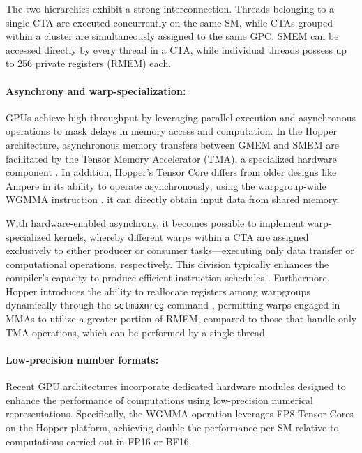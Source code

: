 \begin{enumerate}
The two hierarchies exhibit a strong interconnection. Threads belonging to a single CTA are executed concurrently on the same SM, while CTAs grouped within a cluster are simultaneously assigned to the same GPC. SMEM can be accessed directly by every thread in a CTA, while individual threads possess up to 256 private registers (RMEM) each.

\paragraph{Asynchrony and warp-specialization:}

GPUs achieve high throughput by leveraging parallel execution and asynchronous operations to mask delays in memory access and computation. In the Hopper architecture, asynchronous memory transfers between GMEM and SMEM are facilitated by the Tensor Memory Accelerator (TMA), a specialized hardware component \cite[\S7.29]{cuda}. In addition, Hopper’s Tensor Core differs from older designs like Ampere in its ability to operate asynchronously; using the warpgroup-wide WGMMA instruction \cite[\S9.7.14]{ptx}, it can directly obtain input data from shared memory.

With hardware-enabled asynchrony, it becomes possible to implement warp-specialized kernels, whereby different warps within a CTA are assigned exclusively to either producer or consumer tasks—executing only data transfer or computational operations, respectively. This division typically enhances the compiler's capacity to produce efficient instruction schedules \citep{warp-specialization-2011}. Furthermore, Hopper introduces the ability to reallocate registers among warpgroups dynamically through the \verb|setmaxnreg| command \cite[\S9.7.17.1]{ptx}, permitting warps engaged in MMAs to utilize a greater portion of RMEM, compared to those that handle only TMA operations, which can be performed by a single thread.

\paragraph{Low-precision number formats:}
\label{sec:low-precision-gpu}
Recent GPU architectures incorporate dedicated hardware modules designed to enhance the performance of computations using low-precision numerical representations. Specifically, the WGMMA operation leverages FP8 Tensor Cores on the Hopper platform, achieving double the performance per SM relative to computations carried out in FP16 or BF16.


\end{enumerate}
